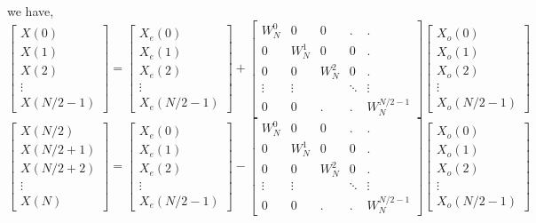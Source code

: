 \documentclass[journal,12pt,twocolumn]{IEEEtran}
\renewcommand\thesection{\arabic{section}}
\begin{document}
\begin{enumerate}[label=\thesection.\arabic*.,ref=\thesection.\theenumi]
we have,
\begin{equation}
\begin{bmatrix}
X(0) \\
X(1) \\
X(2) \\
\vdots \\

X(N/2-1)
\end{bmatrix}
= 
\begin{bmatrix}
X_{e}(0) \\
X_{e}(1) \\
X_{e}(2) \\
\vdots \\

X_{e}(N/2-1)
\end{bmatrix}
+
\begin{bmatrix}
W^{0}_{N} & 0  &0 &. &. \\
0 & W^{1}_{N} & 0 & 0 &. \\
0 & 0 & W^{2}_{N} & 0 &. \\
\vdots & \vdots& & \ddots & \vdots\\
0 & 0 &. &. &W^{N/2-1}_{N}
\end{bmatrix}
\begin{bmatrix}
X_{o}(0) \\
X_{o}(1) \\
X_{o}(2) \\
\vdots \\

X_{o}(N/2-1)
\end{bmatrix}
\end{equation}
\bigskip
\begin{equation}
\begin{bmatrix}
X(N/2) \\
X(N/2+1) \\
X(N/2+2) \\
\vdots \\

X(N)
\end{bmatrix}
= 
\begin{bmatrix}
X_{e}(0) \\
X_{e}(1) \\
X_{e}(2) \\
\vdots \\

X_{e}(N/2-1)
\end{bmatrix}
-
\begin{bmatrix}
W^{0}_{N} & 0  &0 &. &. \\
0 & W^{1}_{N} & 0 & 0 &. \\
0 & 0 & W^{2}_{N} & 0 &. \\
\vdots & \vdots& & \ddots & \vdots\\
0 & 0 &. &. &W^{N/2-1}_{N}
\end{bmatrix}
\begin{bmatrix}
X_{o}(0) \\
X_{o}(1) \\
X_{o}(2) \\
\vdots \\
X_{o}(N/2-1)
\end{bmatrix}
\end{equation}


\end{enumerate}
\end{document}
